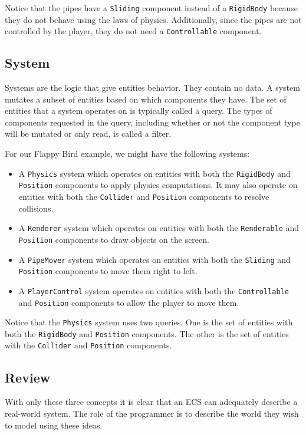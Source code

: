 \documentclass[conference]{IEEEtran}
\begin{document}
Notice that the pipes have a \verb|Sliding| component instead of a \verb|RigidBody| because they do not behave using the laws of physics. Additionally, since the pipes are not controlled by the player, they do not need a \verb|Controllable| component.

\subsection{System}
Systems are the logic that give entities behavior. They contain no data. A system mutates a subset of entities based on which components they have. The set of entities that a system operates on is typically called a query. The types of components requested in the query, including whether or not the component type will be mutated or only read, is called a filter.

For our Flappy Bird example, we might have the following systems:
\begin{itemize}
\item A \verb|Physics| system which operates on entities with both the \verb|RigidBody| and \verb|Position| components to apply physics computations. It may also operate on entities with both the \verb|Collider| and \verb|Position| components to resolve collisions.
\item A \verb|Renderer| system which operates on entities with both the \verb|Renderable| and \verb|Position| components to draw objects on the screen.
\item A \verb|PipeMover| system which operates on entities with both the \verb|Sliding| and \verb|Position| components to move them right to left.
\item A \verb|PlayerControl| system operates on entities with both the \verb|Controllable| and \verb|Position| components to allow the player to move them.
\end{itemize}

Notice that the \verb|Physics| system uses two queries. One is the set of entities with both the \verb|RigidBody| and \verb|Position| components. The other is the set of entities with the \verb|Collider| and \verb|Position| components.

\subsection{Review}
With only these three concepts it is clear that an ECS can adequately describe a real-world system. The role of the programmer is to describe the world they wish to model using these ideas. 
\end{document}
